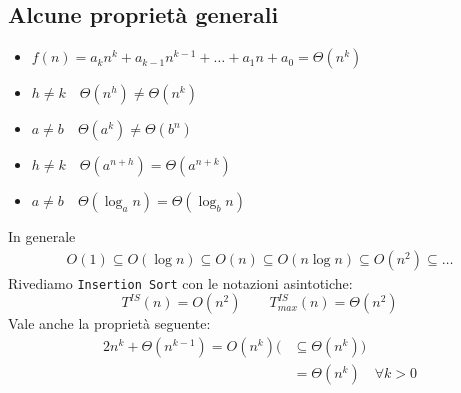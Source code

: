 \subsection{Alcune proprietà generali}
\begin{itemize}
	\item $f(n) = a_kn^k + a_{k-1}n^{k-1} + \dots + a_1n + a_0 = \Theta (n^k)$
	\item $h \neq k \quad \Theta (n^h) \neq \Theta (n^k)$
	\item $a \neq b \quad \Theta (a^k) \neq \Theta (b^n)$
	\item $h \neq k \quad \Theta (a^{n+h}) = \Theta (a^{n+k})$
	\item $a \neq b \quad \Theta (\log_an) = \Theta (\log_bn)$
\end{itemize} 
In generale
\begin{gather*}
	O(1) \subseteq O(\log n) \subseteq O(n) \subseteq O(n \log n) \subseteq O(n^2) \subseteq \dots
\end{gather*}
Rivediamo \texttt{Insertion Sort} con le notazioni asintotiche:
\begin{displaymath}
	T^{IS}(n) = O(n^2) \qquad T^{IS}_{max}(n) = \Theta (n^2)
\end{displaymath}
Vale anche la proprietà seguente:
\begin{align*}
	2n^k + \Theta (n^{k-1}) = O(n^k) (&\subseteq \Theta (n^k)) \\
	& = \Theta (n^k) \quad \forall k > 0
\end{align*}
